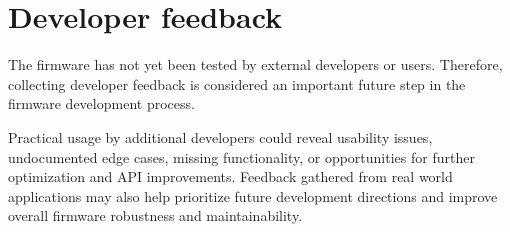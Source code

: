 \section{Developer feedback}
The firmware has not yet been tested by external developers or users.
Therefore, collecting developer feedback is considered an important future step in the firmware development process.

Practical usage by additional developers could reveal usability issues, undocumented edge cases, missing functionality,
or opportunities for further optimization and API improvements.
Feedback gathered from real world applications may also help prioritize future 
development directions and improve overall firmware robustness and maintainability.
